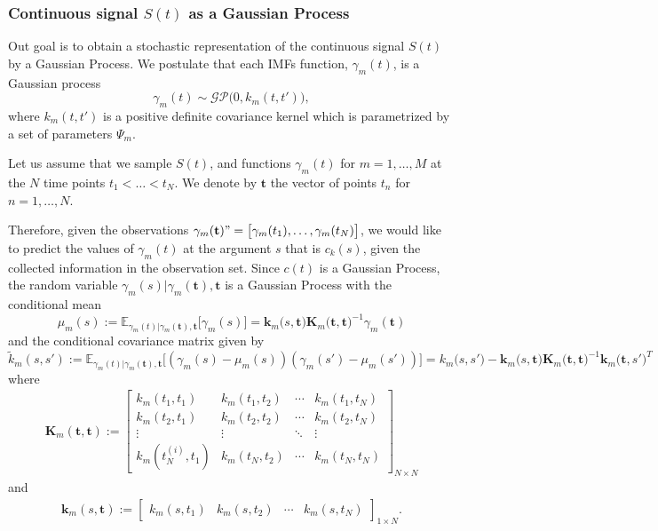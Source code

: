 \subsubsection{Continuous signal $S(t)$ as a Gaussian Process}
Out goal is to obtain a stochastic representation of the continuous signal $S(t)$ by a Gaussian Process. We postulate that each IMFs function, $\gamma_m(t)$, is a Gaussian process 
\begin{equation}\label{eq:model_IMF_GP_k}
\gamma_m(t) \sim \mathcal{GP} \Big(0, k_m(t,t')\Big), 
\end{equation}
where $k_m(t,t')$ is a positive definite covariance kernel which is parametrized by a set of parameters $\Psi_m$.  

Let us assume that we sample $S(t)$, and functions $\gamma_m(t)$ for $m = 1,\ldots, M$ at the $N$ time points $t_1 < \ldots <t_N$. We denote by $\mathbf{t}$ the vector of points $t_n$ for $n = 1,\ldots, N$.  

Therefore, given the observations $\gamma_m(\mathbf{t}) "= \big[ \gamma_m(t_1), \ldots, \gamma_m(t_N) \big]$, we would like to predict the values of $\gamma_m(t)$ at the argument $s$ that is $c_k(s)$, given the collected information in the observation set. Since $c(t)$ is a Gaussian Process, the random variable $\gamma_m(s)| \gamma_m(\mathbf{t}), \mathbf{t}$ is a Gaussian Process with the conditional mean
\begin{equation*}
\mu_m(s):=\mathbb{E}_{\gamma_m(t)|\gamma_m(\mathbf{t}), \mathbf{t}} \big[\gamma_m(s) \big] =  \mathbf{k}_m \big(s,\mathbf{t}\big) \mathbf{K}_m \big(\mathbf{t},\mathbf{t}\big)^{-1} \gamma_m(\mathbf{t})
\end{equation*}
and the conditional covariance matrix given by
\begin{equation*}
\tilde{k}_m(s,s'):= \mathbb{E}_{\gamma_m(t)|\gamma_m(\mathbf{t}), \mathbf{t}} \bigg[(\gamma_m(s) - \mu_m(s))(\gamma_m(s') - \mu_m(s'))\bigg] = k_m \big(s,s'\big) - \mathbf{k}_m\big(s,\mathbf{t}\big) \mathbf{K}_m \big(\mathbf{t},\mathbf{t}\big)^{-1} \mathbf{k}_m \big(\mathbf{t},s'\big) ^T
\end{equation*}
where
\begin{align*}
\mathbf{K}_m (\mathbf{t},\mathbf{t}) := \begin{bmatrix}
k_m(t_1,t_1) & k_m(t_1,t_2)& \cdots & k_m(t_1,t_{N}) \\
k_m(t_2,t_1) & k_m(t_2,t_2)& \cdots & k_m(t_2,t_{N}) \\
\vdots & \vdots & \ddots & \vdots  \\
k_m(t_{N}^{(i)},t_1) & k_m(t_{N},t_2)& \cdots & k_m(t_{N},t_{N}) 
\end{bmatrix}_{ N \times N}
\end{align*}
and
\begin{align*}
\mathbf{k}_m (s,\mathbf{t}) := \begin{bmatrix}
k_m(s,t_1) & k_m(s,t_2)& \cdots & k_m(s,t_{N})
\end{bmatrix}_{ 1 \times N}. 
\end{align*}

